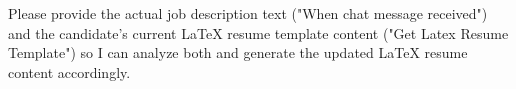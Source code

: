 Please provide the actual job description text ("When chat message received") and the candidate's current LaTeX resume template content ("Get Latex Resume Template") so I can analyze both and generate the updated LaTeX resume content accordingly.